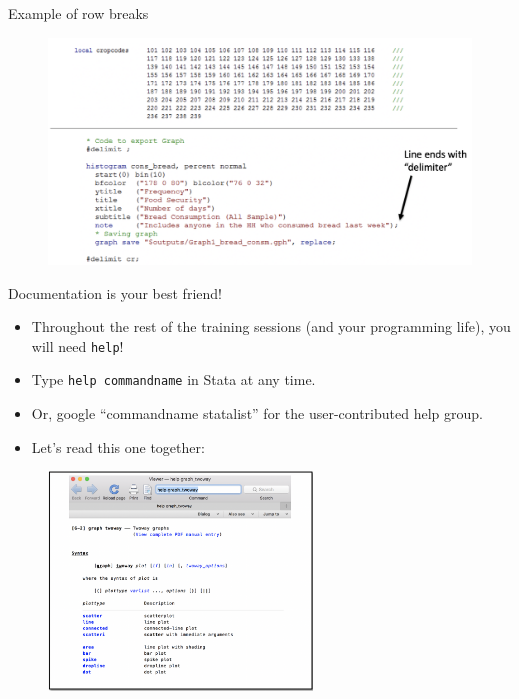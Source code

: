 \documentclass[aspectratio=169]{beamer}
\begin{document}
\begin{frame}{Example of row breaks}

\begin{figure}
	\centering
	\includegraphics[width=\linewidth]{img/Row_break}
\end{figure}

\end{frame}


\begin{frame}[fragile]{Documentation is your best friend!}
\begin{multicols}{2}	
	
	\begin{itemize}[<default overlay specification>]
		\item<1>  Throughout the rest of the training sessions (and your programming life), you will need \texttt{help}!
		\item<1>  Type \texttt{help commandname} in Stata at any time.
		\item<1>  Or, google “commandname statalist” for the user-contributed help group. 
		\item<1>  Let’s read this one together:
	\end{itemize}
	
	\begin{figure}
		\centering
		\includegraphics[width=70mm, right]{img/Help_file}
	\end{figure}
	
\end{multicols}
\end{frame}
\end{document}
